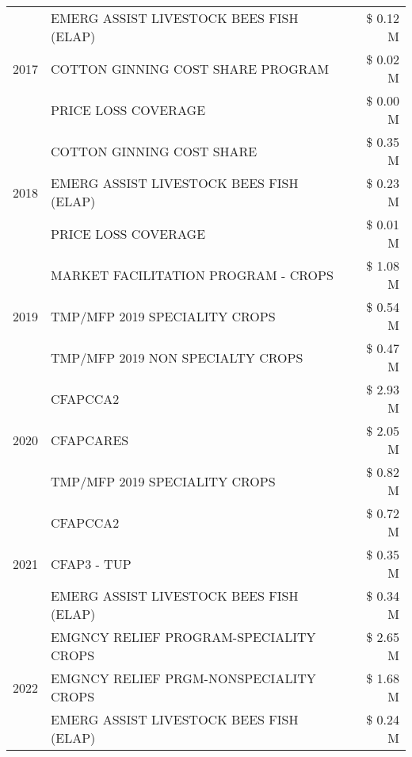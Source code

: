\begin{tabular}{llr}
\cline{1-3}
\multirow[t]{3}{*}{2017} & EMERG ASSIST LIVESTOCK BEES FISH (ELAP) & \$ 0.12 M \\
 & COTTON GINNING COST SHARE PROGRAM & \$ 0.02 M \\
 & PRICE LOSS COVERAGE & \$ 0.00 M \\
\cline{1-3}
\multirow[t]{3}{*}{2018} & COTTON GINNING COST SHARE & \$ 0.35 M \\
 & EMERG ASSIST LIVESTOCK BEES FISH (ELAP) & \$ 0.23 M \\
 & PRICE LOSS COVERAGE & \$ 0.01 M \\
\cline{1-3}
\multirow[t]{3}{*}{2019} & MARKET FACILITATION PROGRAM - CROPS & \$ 1.08 M \\
 & TMP/MFP 2019 SPECIALITY CROPS & \$ 0.54 M \\
 & TMP/MFP 2019 NON SPECIALTY CROPS & \$ 0.47 M \\
\cline{1-3}
\multirow[t]{3}{*}{2020} & CFAPCCA2 & \$ 2.93 M \\
 & CFAPCARES & \$ 2.05 M \\
 & TMP/MFP 2019 SPECIALITY CROPS & \$ 0.82 M \\
\cline{1-3}
\multirow[t]{3}{*}{2021} & CFAPCCA2 & \$ 0.72 M \\
 & CFAP3 - TUP & \$ 0.35 M \\
 & EMERG ASSIST LIVESTOCK BEES FISH (ELAP) & \$ 0.34 M \\
\cline{1-3}
\multirow[t]{3}{*}{2022} & EMGNCY RELIEF PROGRAM-SPECIALITY CROPS & \$ 2.65 M \\
 & EMGNCY RELIEF PRGM-NONSPECIALITY CROPS & \$ 1.68 M \\
 & EMERG ASSIST LIVESTOCK BEES FISH (ELAP) & \$ 0.24 M \\
\cline{1-3}
\bottomrule
\end{tabular}
